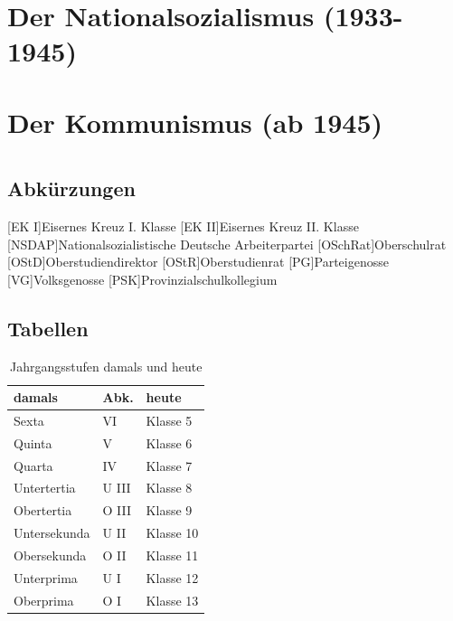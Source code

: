 \documentclass[a5paper,11pt,headings=normal,BCOR=8mm,DIV=calc]{scrbook}
\begin{document}
\chapter{Der Nationalsozialismus (1933-1945)}


\chapter{Der Kommunismus (ab 1945)}


\mbox{}
\newpage

\chapter*{}

\mbox{}
\newpage




\newpage
\appendix
{}
\section*{Abkürzungen}
\begin{acronym}
	[EK I]{Eisernes Kreuz I. Klasse}
	[EK II]{Eisernes Kreuz II. Klasse}
	[NSDAP]{Nationalsozialistische Deutsche Arbeiterpartei}
	[OSchRat]{Oberschulrat}
	[OStD]{Ober\-studien\-di\-rek\-tor}
	[OStR]{Oberstudienrat}
	[PG]{Parteigenosse}
	[VG]{Volksgenosse}
	[PSK]{Provinzialschulkollegium}
\end{acronym}

\newpage
\section*{Tabellen}
\begin{table}[h!]
	\label{tab:jahrgangsstufen}
	\centering
	\begin{tabular}{l|l||l}
		damals & Abk. & heute \\
		\hline
		Sexta & VI & Klasse 5 \\
		Quinta & V & Klasse 6 \\
		Quarta & IV & Klasse 7 \\
		Untertertia & U III & Klasse 8 \\
		Obertertia & O III & Klasse 9 \\
		Untersekunda & U II & Klasse 10 \\
		Obersekunda & O II & Klasse 11 \\
		Unterprima & U I & Klasse 12 \\
		Oberprima & O I & Klasse 13 \\
	\end{tabular}
	\caption{Jahrgangsstufen damals und heute}
\end{table}
\end{document}
